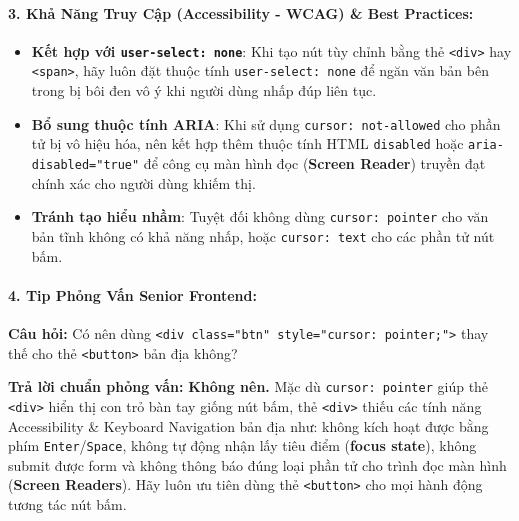\documentclass[11pt,oneside]{book}
\newcommand{\codeinline}[1]{\textcolor{accentOrange}{\texttt{#1}}}
\newcommand{\term}[1]{\textbf{\textcolor{primaryBlue}{#1}}}
\begin{document}
\paragraph{3. Khả Năng Truy Cập (Accessibility - WCAG) \& Best Practices:}
\begin{itemize}[leftmargin=1.5em, itemsep=3pt, parsep=0pt]
    \item \textbf{Kết hợp với \codeinline{user-select: none}}: Khi tạo nút tùy chỉnh bằng thẻ \codeinline{<div>} hay \codeinline{<span>}, hãy luôn đặt thuộc tính \codeinline{user-select: none} để ngăn văn bản bên trong bị bôi đen vô ý khi người dùng nhấp đúp liên tục.
    \item \textbf{Bổ sung thuộc tính ARIA}: Khi sử dụng \codeinline{cursor: not-allowed} cho phần tử bị vô hiệu hóa, nên kết hợp thêm thuộc tính HTML \codeinline{disabled} hoặc \codeinline{aria-disabled="true"} để công cụ màn hình đọc (\term{Screen Reader}) truyền đạt chính xác cho người dùng khiếm thị.
    \item \textbf{Tránh tạo hiểu nhầm}: Tuyệt đối không dùng \codeinline{cursor: pointer} cho văn bản tĩnh không có khả năng nhấp, hoặc \codeinline{cursor: text} cho các phần tử nút bấm.
\end{itemize}

\paragraph{4. Tip Phỏng Vấn Senior Frontend:}
\begin{tipBox}
\textbf{Câu hỏi:} Có nên dùng \codeinline{<div class="btn" style="cursor: pointer;">} thay thế cho thẻ \codeinline{<button>} bản địa không?
\par\vspace{4pt}
\textbf{Trả lời chuẩn phỏng vấn:} \textbf{Không nên.} Mặc dù \codeinline{cursor: pointer} giúp thẻ \codeinline{<div>} hiển thị con trỏ bàn tay giống nút bấm, thẻ \codeinline{<div>} thiếu các tính năng Accessibility \& Keyboard Navigation bản địa như: không kích hoạt được bằng phím \codeinline{Enter}/\codeinline{Space}, không tự động nhận lấy tiêu điểm (\term{focus state}), không submit được form và không thông báo đúng loại phần tử cho trình đọc màn hình (\term{Screen Readers}). Hãy luôn ưu tiên dùng thẻ \codeinline{<button>} cho mọi hành động tương tác nút bấm.
\end{tipBox}


\end{document}
